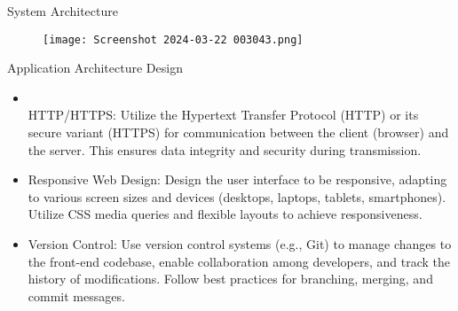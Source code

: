 \documentclass{beamer} %
\begin{document}
\begin{frame}{System Architecture}
    \begin{itemize}

        \begin{figure}[H]
\texttt{[image: Screenshot 2024-03-22 003043.png]}
\item[System architecture of house maintenance service website.] 
    
\end{figure}
    
    \end{itemize}
\end{frame}


\begin{frame}{Application Architecture Design}
    \begin{minipage}{1\textwidth}
            \begin{itemize}
                \item \\HTTP/HTTPS: Utilize the Hypertext Transfer Protocol (HTTP) or its secure variant (HTTPS) for communication between the client (browser) and the server. This ensures data integrity and security during transmission.
                \item Responsive Web Design: Design the user interface to be responsive, adapting to various screen sizes and devices (desktops, laptops, tablets, smartphones). Utilize CSS media queries and flexible layouts to achieve responsiveness.  
                \item Version Control: Use version control systems (e.g., Git) to manage changes to the front-end codebase, enable collaboration among developers, and track the history of modifications. Follow best practices for branching, merging, and commit messages.
            \end{itemize}
        \end{minipage}
        
\end{frame}
\end{document}
